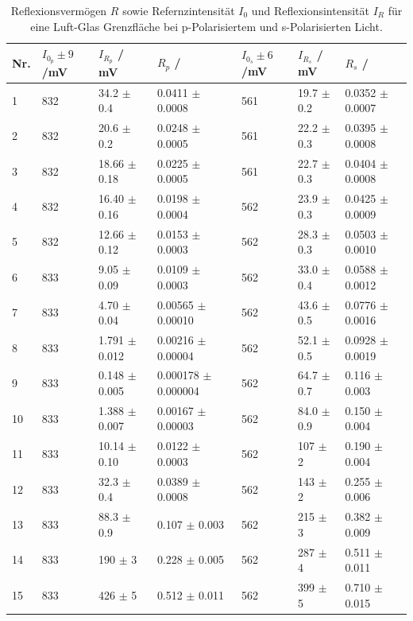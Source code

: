 \documentclass[12pt,a4paper,twoside]{article}
\begin{document}
\begin{table}[H]
    \centering
    \caption{Reflexionsvermögen $R$ sowie Refernzintensität $I_0$ und Reflexionsintensität $I_R$ für eine Luft-Glas Grenzfläche bei p-Polarisiertem und s-Polarisierten Licht.}
    \label{tab:reflexionsvermögen luft glas}
    \begin{tabular}{| l | l | l | l | l | l | l |}
        \hline
        Nr. & $I_{0_p} \pm 9$/mV & $I_{R_p}$ / mV & $R_p$ /  & $I_{0_s} \pm 6$/mV & $I_{R_s}$ / mV & $R_s$ / \\
        \hline
        1  & 832  & 34.2  $\pm$ 0.4     & 0.0411    $\pm$ 0.0008    & 561 & 19.7  $\pm$ 0.2    & 0.0352  $\pm$ 0.0007    \\
        2  & 832  & 20.6  $\pm$ 0.2     & 0.0248    $\pm$ 0.0005    & 561 & 22.2  $\pm$ 0.3    & 0.0395  $\pm$ 0.0008    \\
        3  & 832  & 18.66 $\pm$ 0.18    & 0.0225    $\pm$ 0.0005    & 561 & 22.7  $\pm$ 0.3    & 0.0404  $\pm$ 0.0008    \\
        4  & 832  & 16.40 $\pm$ 0.16    & 0.0198    $\pm$ 0.0004    & 562 & 23.9  $\pm$ 0.3    & 0.0425  $\pm$ 0.0009    \\
        5  & 832  & 12.66 $\pm$ 0.12    & 0.0153    $\pm$ 0.0003    & 562 & 28.3  $\pm$ 0.3    & 0.0503  $\pm$ 0.0010    \\
        6  & 833  & 9.05  $\pm$ 0.09    & 0.0109    $\pm$ 0.0003    & 562 & 33.0  $\pm$ 0.4    & 0.0588  $\pm$ 0.0012    \\
        7  & 833  & 4.70  $\pm$ 0.04    & 0.00565   $\pm$ 0.00010   & 562 & 43.6  $\pm$ 0.5    & 0.0776  $\pm$ 0.0016    \\
        8  & 833  & 1.791 $\pm$ 0.012   & 0.00216   $\pm$ 0.00004   & 562 & 52.1  $\pm$ 0.5    & 0.0928  $\pm$ 0.0019    \\
        9  & 833  & 0.148 $\pm$ 0.005   & 0.000178  $\pm$ 0.000004  & 562 & 64.7  $\pm$ 0.7    & 0.116   $\pm$ 0.003     \\
        10 & 833  & 1.388 $\pm$ 0.007   & 0.00167   $\pm$ 0.00003   & 562 & 84.0  $\pm$ 0.9    & 0.150   $\pm$ 0.004     \\
        11 & 833  & 10.14 $\pm$ 0.10    & 0.0122    $\pm$ 0.0003    & 562 & 107   $\pm$ 2      & 0.190   $\pm$ 0.004     \\
        12 & 833  & 32.3  $\pm$ 0.4     & 0.0389    $\pm$ 0.0008    & 562 & 143   $\pm$ 2      & 0.255   $\pm$ 0.006     \\
        13 & 833  & 88.3  $\pm$ 0.9     & 0.107     $\pm$ 0.003     & 562 & 215   $\pm$ 3      & 0.382   $\pm$ 0.009     \\
        14 & 833  & 190   $\pm$ 3       & 0.228     $\pm$ 0.005     & 562 & 287   $\pm$ 4      & 0.511   $\pm$ 0.011     \\
        15 & 833  & 426   $\pm$ 5       & 0.512     $\pm$ 0.011     & 562 & 399   $\pm$ 5      & 0.710   $\pm$ 0.015     \\
        \hline
    \end{tabular}
\end{table}
\end{document}

